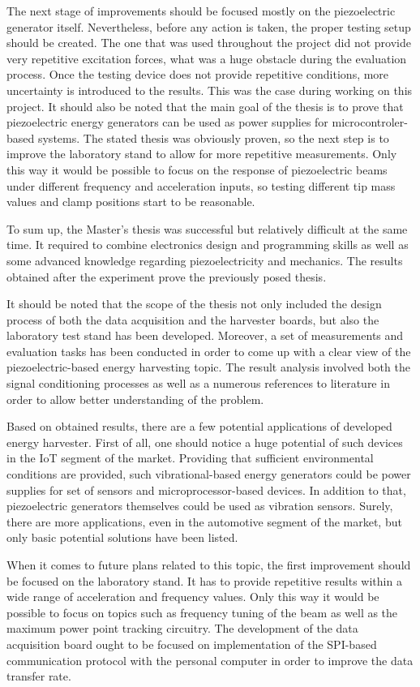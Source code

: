 \documentclass[12pt,a4paper]{article}
\begin{document}
\par
The next stage of improvements should be focused mostly on the piezoelectric generator itself. Nevertheless, before any action is taken, the proper testing setup should be created. The one that was used throughout the project did not provide very repetitive excitation forces, what was a huge obstacle during the evaluation process. Once the testing device does not provide repetitive conditions, more uncertainty is introduced to the results. This was the case during working on this project. It should also be noted that the main goal of the thesis is to prove that piezoelectric energy generators can be used as power supplies for microcontroler-based systems. The stated thesis was obviously proven, so the next step is to improve the laboratory stand to allow for more repetitive measurements. Only this way it would be possible to focus on the response of piezoelectric beams under different frequency and acceleration inputs, so testing different tip mass values and clamp positions start to be reasonable.
\par
To sum up, the Master's thesis was successful but relatively difficult at the same time. It required to combine electronics design and programming skills as well as some advanced knowledge regarding piezoelectricity and mechanics. The results obtained after the experiment prove the previously posed thesis. 
\par
It should be noted that the scope of the thesis not only included the design process of both the data acquisition and the harvester boards, but also the laboratory test stand has been developed. Moreover, a set of measurements and evaluation tasks has been conducted in order to come up with a clear view of the piezoelectric-based energy harvesting topic. The result analysis involved both the signal conditioning processes as well as a numerous references to literature in order to allow better understanding of the problem.
\par
Based on obtained results, there are a few potential applications of developed energy harvester. First of all, one should notice a huge potential of such devices in the IoT segment of the market. Providing that sufficient environmental conditions are provided, such vibrational-based energy generators could be power supplies for set of sensors and microprocessor-based devices. In addition to that, piezoelectric generators themselves could be used as vibration sensors. Surely, there are more applications, even in the automotive segment of the market, but only basic potential solutions have been listed.
\par
When it comes to future plans related to this topic, the first improvement should be focused on the laboratory stand. It has to provide repetitive results within a wide range of acceleration and frequency values. Only this way it would be possible to focus on topics such as frequency tuning of the beam as well as the maximum power point tracking circuitry. The development of the data acquisition board ought to be focused on implementation of the SPI-based communication protocol with the personal computer in order to improve the data transfer rate.
\end{document}

